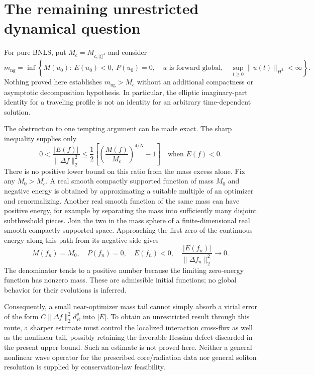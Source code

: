 \documentclass[11pt,a4paper]{article}
\theoremstyle{remark}\newtheorem{remark}[theorem]{Remark}
\begin{document}




\section{The remaining unrestricted dynamical question}
For pure BNLS, put $M_c=M_{c,|\xi|^4}$ and consider
\[
 m_{\mathrm{ng}}=\inf\left\{M(u_0):\ E(u_0)<0,\ P(u_0)=0,\quad
 u\text{ is forward global},\quad
 \sup_{t\ge0}\|u(t)\|_{H^2}<\infty\right\}.
\]
Nothing proved here establishes $m_{\mathrm{ng}}>M_c$ without an additional compactness or asymptotic decomposition hypothesis. In particular, the elliptic imaginary-part identity for a traveling profile is not an identity for an arbitrary time-dependent solution.

The obstruction to one tempting argument can be made exact. The sharp inequality supplies only
\[
 0<\frac{|E(f)|}{\|\Delta f\|_2^2}
 \le\frac12\left[\left(\frac{M(f)}{M_c}\right)^{4/N}-1\right]
 \quad\text{when } E(f)<0.
\]
There is no positive lower bound on this ratio from the mass excess alone. Fix any $M_0>M_c$. A real smooth compactly supported function of mass $M_0$ and negative energy is obtained by approximating a suitable multiple of an optimizer and renormalizing. Another real smooth function of the same mass can have positive energy, for example by separating the mass into sufficiently many disjoint subthreshold pieces. Join the two in the mass sphere of a finite-dimensional real smooth compactly supported space. Approaching the first zero of the continuous energy along this path from its negative side gives
\[
 M(f_n)=M_0,\quad P(f_n)=0,\quad E(f_n)<0,\quad
 \frac{|E(f_n)|}{\|\Delta f_n\|_2^2}\longrightarrow0.
\]
The denominator tends to a positive number because the limiting zero-energy function has nonzero mass. These are admissible initial functions; no global behavior for their evolutions is inferred.

Consequently, a small near-optimizer mass tail cannot simply absorb a virial error of the form $C\|\Delta f\|_2^2d_R^\theta$ into $|E|$. To obtain an unrestricted result through this route, a sharper estimate must control the localized interaction cross-flux as well as the nonlinear tail, possibly retaining the favorable Hessian defect discarded in the present upper bound. Such an estimate is not proved here. Neither a general nonlinear wave operator for the prescribed core/radiation data nor general soliton resolution is supplied by conservation-law feasibility.
\end{document}
